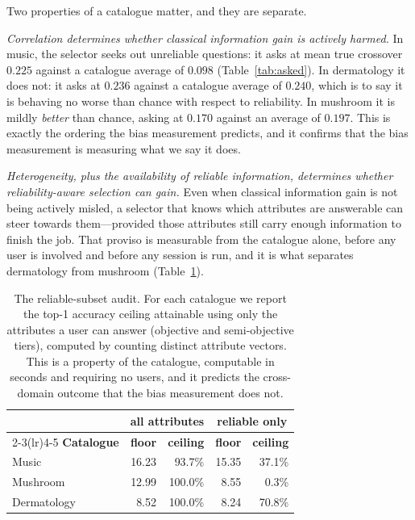 Two properties of a catalogue matter, and they are separate.

\emph{Correlation determines whether classical information gain is actively
harmed.} In music, the selector seeks out unreliable questions: it asks at mean
true crossover $0.225$ against a catalogue average of $0.098$
(Table~\ref{tab:asked}). In dermatology it does not: it asks at $0.236$ against
a catalogue average of $0.240$, which is to say it is behaving no worse than
chance with respect to reliability. In mushroom it is mildly \emph{better} than
chance, asking at $0.170$ against an average of $0.197$. This is exactly the
ordering the bias measurement predicts, and it confirms that the bias
measurement is measuring what we say it does.

\emph{Heterogeneity, plus the availability of reliable information, determines
whether reliability-aware selection can gain.} Even when classical information
gain is not being actively misled, a selector that knows which attributes are
answerable can steer towards them---provided those attributes still carry
enough information to finish the job. That proviso is measurable from the
catalogue alone, before any user is involved and before any session is run, and
it is what separates dermatology from mushroom (Table~\ref{tab:reliable}).

\begin{table}[t]
\caption{The reliable-subset audit. For each catalogue we report the top-1
accuracy ceiling attainable using only the attributes a user can answer
(objective and semi-objective tiers), computed by counting distinct attribute
vectors. This is a property of the catalogue, computable in seconds and
requiring no users, and it predicts the cross-domain outcome that the bias
measurement does not.}
\label{tab:reliable}
\centering
\footnotesize
\begin{tabular}{@{}lrrrr@{}}
\toprule
& \multicolumn{2}{c}{\textbf{all attributes}} &
  \multicolumn{2}{c}{\textbf{reliable only}} \\
\cmidrule(lr){2-3}\cmidrule(lr){4-5}
\textbf{Catalogue} & \textbf{floor} & \textbf{ceiling} &
\textbf{floor} & \textbf{ceiling} \\
\midrule
Music       & 16.23 & 93.7\% & 15.35 & 37.1\% \\
Mushroom    & 12.99 & 100.0\% & 8.55 & 0.3\% \\
Dermatology & 8.52  & 100.0\% & 8.24 & 70.8\% \\
\bottomrule
\end{tabular}
\end{table}

